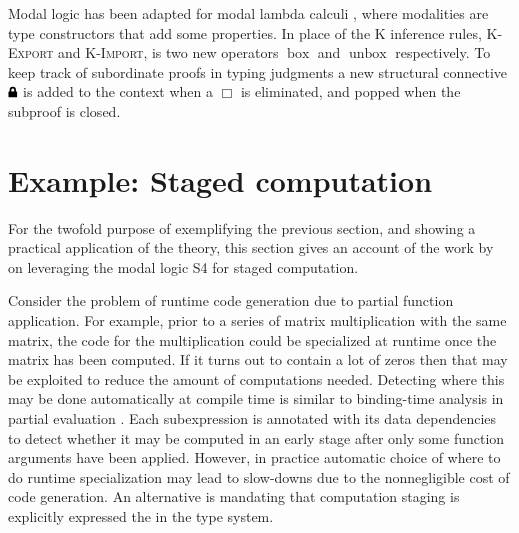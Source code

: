 \documentclass[12pt,twoside,openright]{report}
\numberwithin{equation}{chapter}
\numberwithin{figure}{chapter}
\numberwithin{table}{chapter}
\theoremstyle{definition}\newtheorem{definition}{Definition}
\newcommand{\lock}{\text{\tikz[baseline]{
      \fill[rounded corners=.1ex] (-.75ex,0) rectangle (.75ex,1ex);
      \draw[line width=.3ex] (-.4ex,.5ex) -- ++(0,.75ex) arc (180:0:.4ex) -- ++(0,-.75ex);
}}}
\begin{document}
Modal logic has been adapted for modal lambda calculi \cite{borghuis94},
where modalities are type constructors that add some properties.
In place of the K inference rules, \textsc{K-Export} and \textsc{K-Import},
is two new operators $\operatorname{box}$ and $\operatorname{unbox}$
respectively.
To keep track of subordinate proofs in typing judgments
a new structural connective $\lock$ is added to the context when a $\Box$ is eliminated,
and popped when the subproof is closed.

\section{Example: Staged computation}

For the twofold purpose of exemplifying the previous section,
and showing a practical application of the theory,
this section gives an account of the work by \textcite{davies01}
on leveraging the modal logic S4 for staged computation.

Consider the problem of runtime code generation due to partial function application.
For example, prior to a series of matrix multiplication with the same matrix,
the code for the multiplication could be specialized at runtime
once the matrix has been computed.
If it turns out to contain a lot of zeros then that may be exploited
to reduce the amount of computations needed.
Detecting where this may be done automatically at compile time
is similar to binding-time analysis in partial evaluation \cite{leone94}.
Each subexpression is annotated with its data dependencies
to detect whether it may be computed in an early stage
after only some function arguments have been applied.
However, in practice automatic choice of where to do runtime specialization
may lead to slow-downs due to the nonnegligible cost of code generation.
An alternative is mandating that computation staging is explicitly expressed
the in the type system.
\end{document}

